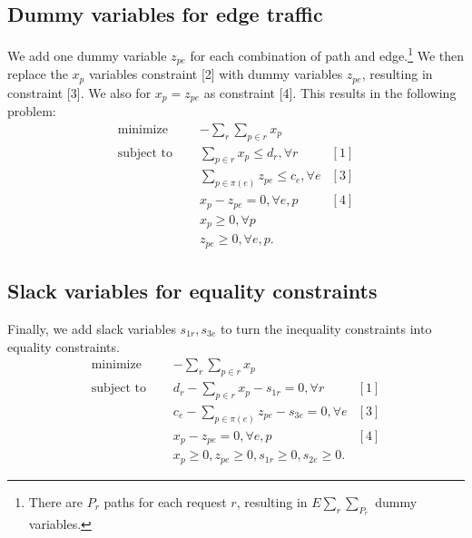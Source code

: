 \documentclass[11pt]{article}
\begin{document}
\subsection{Dummy variables for edge traffic}
We add one dummy variable $z_{pe}$ for each combination of path and edge.\footnote{
There are $P_r$ paths for each request $r$, resulting in
$E\sum_r\sum_{P_r}$ dummy variables.}
We then replace the $x_p$ variables constraint [2] with dummy variables $z_{pe}$,
resulting in constraint [3].
We also for $x_p = z_{pe}$ as constraint [4].
This results in the following problem:
\begin{equation}
\label{eqn:network-opt-sep}
\begin{aligned}
\textrm{minimize } \quad & -\sum_r \sum_{p\in r} x_p\\
\textrm{subject to } \quad
&\sum_{p \in r}x_p \le d_r, \forall r & [1]\\
&\sum_{p\in\pi(e)} z_{pe} \le c_e, \forall e & [3]\\
&x_p - z_{pe} = 0, \forall e,p & [4]\\
& x_p \geq 0, \forall p \\
& z_{pe} \geq 0, \forall e,p.
\end{aligned}
\end{equation}

\subsection{Slack variables for equality constraints}
Finally, we add slack variables $s_{1r},s_{3e}$
to turn the inequality constraints into equality constraints.
\begin{equation}
\label{eqn:network-opt-sep-eq}
\begin{aligned}
\textrm{minimize } \quad & -\sum_r \sum_{p\in r} x_p\\
\textrm{subject to } \quad
&d_r - \sum_{p \in r}x_p - s_{1r} = 0, \forall r & [1]\\
&c_e - \sum_{p\in\pi(e)} z_{pe} - s_{3e}= 0, \forall e & [3]\\
&x_p - z_{pe} = 0, \forall e,p & [4]\\
& x_p \geq 0,
z_{pe} \geq 0,
s_{1r} \geq 0,
s_{2e} \geq 0.
\end{aligned}
\end{equation}
\end{document}
